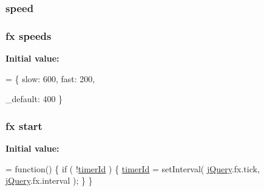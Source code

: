 \subsubsection[{speed}]{ speed}\label{_bibabook_2_scripts_2jquery-1_810_82_8js_add98c90065e6563cba26ff6d2016c46c}
\hypertarget{_bibabook_2_scripts_2jquery-1_810_82_8js_a1079544ab08b6d4ca1692ce090f6ea2d}{}
\subsubsection[{speeds}]{ {\bf fx} speeds}\label{_bibabook_2_scripts_2jquery-1_810_82_8js_a1079544ab08b6d4ca1692ce090f6ea2d}
{\bfseries Initial value\+:}
\begin{DoxyCode}
= \{
    slow: 600,
    fast: 200,
    
    \_default: 400
\}
\end{DoxyCode}
\hypertarget{_bibabook_2_scripts_2jquery-1_810_82_8js_aef10902ffededd983608fdb8dbfc441a}{}
\subsubsection[{start}]{ {\bf fx} start}\label{_bibabook_2_scripts_2jquery-1_810_82_8js_aef10902ffededd983608fdb8dbfc441a}
{\bfseries Initial value\+:}
\begin{DoxyCode}
= \textcolor{keyword}{function}() \{
    \textcolor{keywordflow}{if} ( !\hyperlink{_bibabook_2_scripts_2jquery-1_810_82_8js_aa447439fbe7027e58837a297297c9d8a}{timerId} ) \{
        \hyperlink{_bibabook_2_scripts_2jquery-1_810_82_8js_aa447439fbe7027e58837a297297c9d8a}{timerId} = setInterval( \hyperlink{_bibabook_2_scripts_2jquery-1_810_82_8js_a5e01048fbd3a30b44e8d491d8945c457}{jQuery}.fx.tick, \hyperlink{_bibabook_2_scripts_2jquery-1_810_82_8js_a5e01048fbd3a30b44e8d491d8945c457}{jQuery}.fx.interval );
    \}
\}
\end{DoxyCode}
\hypertarget{_bibabook_2_scripts_2jquery-1_810_82_8js_a7337229078e935a813e7e0f674fad739}{}
